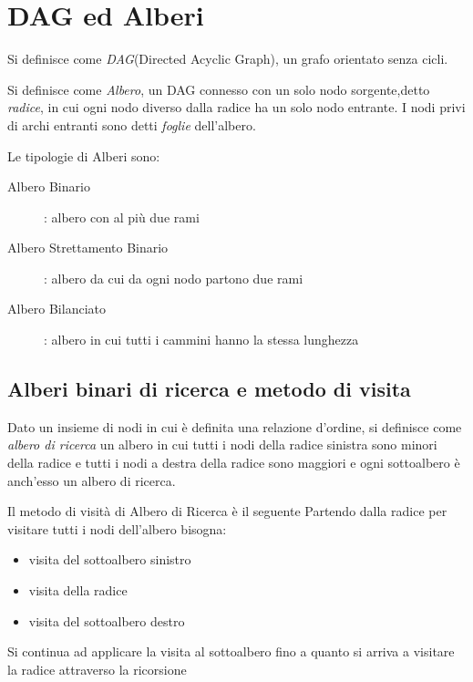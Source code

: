 \section{DAG ed Alberi}
Si definisce come \emph{DAG}(Directed Acyclic Graph), un grafo orientato senza cicli.

Si definisce come \emph{Albero}, un DAG connesso con un solo nodo sorgente,detto \emph{radice},
in cui ogni nodo diverso dalla radice ha un solo nodo entrante.\newline
I nodi privi di archi entranti sono detti \emph{foglie} dell'albero.


Le tipologie di Alberi sono:
\begin{description}
    \item[Albero Binario]: albero con al più due rami
    \item[Albero Strettamento Binario]: albero da cui da ogni nodo partono due rami
    \item[Albero Bilanciato]: albero in cui tutti i cammini hanno la stessa lunghezza
\end{description}


\subsection{Alberi binari di ricerca e metodo di visita}
Dato un insieme di nodi in cui è definita una relazione d'ordine, si definisce come
\emph{albero di ricerca} un albero in cui tutti i nodi della radice sinistra sono
minori della radice e tutti i nodi a destra della radice sono maggiori e ogni sottoalbero
è anch'esso un albero di ricerca.


Il metodo di visità di Albero di Ricerca è il seguente
Partendo dalla radice per visitare tutti i nodi dell'albero bisogna:
\begin{itemize}
    \item visita del sottoalbero sinistro
    \item visita della radice
    \item visita del sottoalbero destro
\end{itemize}
Si continua ad applicare la visita al sottoalbero fino a quanto si arriva a visitare la radice
attraverso la ricorsione

